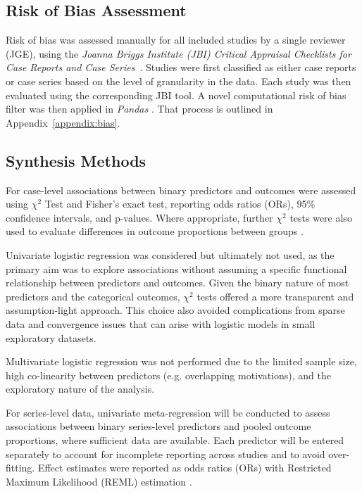 \documentclass[pdflatex,sn-basic,Numbered]{sn-jnl}
\begin{document}
\subsection{Risk of Bias Assessment}

\noindent Risk of bias was assessed manually for all included studies by a single reviewer (JGE), using the \textit{Joanna Briggs Institute (JBI) Critical Appraisal Checklists for Case Reports and Case Series}~\cite{Moola_2020}. Studies were first classified as either case reports or case series based on the level of granularity in the data. Each study was then evaluated using the corresponding JBI tool. A novel computational risk of bias filter was then applied in \textit{Pandas} \cite{ThePandasDevelopmentTeam_2020}. That process is outlined in Appendix~\ref{appendix:bias}.

\subsection{Synthesis Methods}

\noindent For case-level associations between binary predictors and outcomes were assessed using $\chi^2$ Test and Fisher's exact test, reporting odds ratios (ORs), 95\% confidence intervals, and p-values. Where appropriate, further $\chi^2$ tests were also used to evaluate differences in outcome proportions between groups \cite{Machin_2008}. 

Univariate logistic regression was considered but ultimately not used, as the primary aim was to explore associations without assuming a specific functional relationship between predictors and outcomes. Given the binary nature of most predictors and the categorical outcomes, $\chi^2$ tests offered a more transparent and assumption-light approach. This choice also avoided complications from sparse data and convergence issues that can arise with logistic models in small exploratory datasets.

Multivariate logistic regression was not performed due to the limited sample size, high co-linearity between predictors (e.g. overlapping motivations), and the exploratory nature of the analysis. 

For series-level data, univariate meta-regression will be conducted to assess associations between binary series-level predictors and pooled outcome proportions, where sufficient data are available. Each predictor will be entered separately to account for incomplete reporting across studies and to avoid over-fitting. Effect estimates were reported as odds ratios (ORs) with Restricted Maximum Likelihood (REML) estimation \cite{Tanriver-Ayder_2021}.
\end{document}
